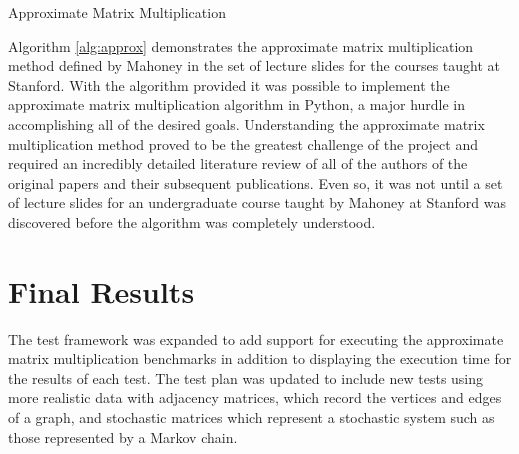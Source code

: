 \documentclass[oneside]{article}
\begin{document}
\begin{algorithm}[!ht]
  \SetAlgoNoLine
  \DontPrintSemicolon
\caption{Approximate Matrix Multiplication}
\label{alg:approx}
\end{algorithm}

Algorithm \ref{alg:approx} demonstrates the approximate matrix multiplication method defined by Mahoney in the set of lecture slides for the courses taught at Stanford\cite{mahoneyCS369M, mahoneyCS294}. With the algorithm provided it was possible to implement the approximate matrix multiplication algorithm in Python, a major hurdle in accomplishing all of the desired goals. Understanding the approximate matrix multiplication method proved to be the greatest challenge of the project and required an incredibly detailed literature review of all of the authors of the original papers and their subsequent publications. Even so, it was not until a set of lecture slides for an undergraduate course taught by Mahoney at Stanford was discovered before the algorithm was completely understood. 







\section{Final Results}

The test framework was expanded to add support for executing the approximate matrix multiplication benchmarks in addition to displaying the execution time for the results of each test. The test plan was updated to include new tests using more realistic data with adjacency matrices, which record the vertices and edges of a graph, and stochastic matrices which represent a stochastic system such as those represented by a Markov chain\cite{yegnanarayanan2013application}.
\end{document}
